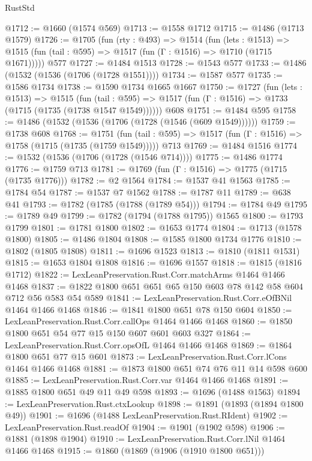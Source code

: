 \begin{lexlean}{RustStd}
\begin{coremodule}
@1712 := @1660 (@1574 @569)
@1713 := @1558 @1712
@1715 := @1486 (@1713 @1579)
@1726 := @1705
    (fun (rty : @493) =>
    @1514
      (fun (lets : @1513) =>
      @1515 (fun (tail : @595) => @1517 (fun (Γ : @1516) => @1710 (@1715 @1671)))))
    @577
@1727 := @1484 @1513
@1728 := @1543 @577
@1733 := @1486 (@1532 (@1536 (@1706 (@1728 @1551))))
@1734 := @1587 @577
@1735 := @1586 @1734
@1738 := @1590 @1734 @1665 @1667
@1750 := @1727
    (fun (lets : @1513) =>
    @1515
      (fun (tail : @595) => @1517 (fun (Γ : @1516) => @1733 (@1715 (@1735 (@1738 @1547 @1549))))))
    @608
@1751 := @1484 @595
@1758 := @1486 (@1532 (@1536 (@1706 (@1728 (@1546 (@609 @1549))))))
@1759 := @1738 @608
@1768 := @1751
    (fun (tail : @595) => @1517 (fun (Γ : @1516) => @1758 (@1715 (@1735 (@1759 @1549)))))
    @713
@1769 := @1484 @1516
@1774 := @1532 (@1536 (@1706 (@1728 (@1546 @714))))
@1775 := @1486 @1774
@1776 := @1759 @713
@1781 := @1769 (fun (Γ : @1516) => @1775 (@1715 (@1735 @1776)))
@1782 := @2 @1564
@1784 := @1537 @41 @1563
@1785 := @1784 @54
@1787 := @1537 @7 @1562
@1788 := @1787 @11
@1789 := @638 @41
@1793 := @1782 (@1785 (@1788 (@1789 @54)))
@1794 := @1784 @49
@1795 := @1789 @49
@1799 := @1782 (@1794 (@1788 @1795)) @1565
@1800 := @1793 @1799
@1801 := @1781 @1800
@1802 := @1653 @1774
@1804 := @1713 (@1578 @1800)
@1805 := @1486 @1804
@1808 := @1585 @1800 @1734 @1776
@1810 := @1802 (@1805 @1808)
@1811 := @1696 @1523
@1813 := @1810 (@1811 @1531)
@1815 := @1653 @1804 @1808
@1816 := @1696 @1557
@1818 := @1815 (@1816 @1712)
@1822 := LexLeanPreservation.Rust.Corr.matchArms @1464 @1466 @1468
@1837 := @1822 @1800 @651 @651 @65 @150 @603 @78 @142 @58 @604 @712 @56 @583 @54 @589
@1841 := LexLeanPreservation.Rust.Corr.eOfBNil @1464 @1466 @1468
@1846 := @1841 @1800 @651 @78 @150 @604
@1850 := LexLeanPreservation.Rust.Corr.callOps @1464 @1466 @1468
@1860 := @1850 @1800 @651 @54 @77 @15 @150 @607 @601 @603 @327
@1864 := LexLeanPreservation.Rust.Corr.opsOfL @1464 @1466 @1468
@1869 := @1864 @1800 @651 @77 @15 @601
@1873 := LexLeanPreservation.Rust.Corr.lCons @1464 @1466 @1468
@1881 := @1873 @1800 @651 @74 @76 @11 @14 @598 @600
@1885 := LexLeanPreservation.Rust.Corr.var @1464 @1466 @1468
@1891 := @1885 @1800 @651 @49 @11 @49 @598
@1893 := @1696 (@1488 @1563)
@1894 := LexLeanPreservation.Rust.ctxLookup
@1898 := @1891 (@1893 (@1894 @1800 @49))
@1901 := @1696 (@1488 LexLeanPreservation.Rust.RIdent)
@1902 := LexLeanPreservation.Rust.readOf
@1904 := @1901 (@1902 @598)
@1906 := @1881 (@1898 @1904)
@1910 := LexLeanPreservation.Rust.Corr.lNil @1464 @1466 @1468
@1915 := @1860 (@1869 (@1906 (@1910 @1800 @651)))

\end{coremodule}
\end{lexlean}
